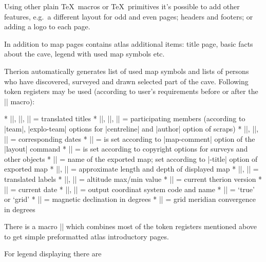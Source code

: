 Using other plain \TeX\ macros or \TeX\ primitives it's possible to add other 
features, e.g.~a different layout for odd and even pages; headers and footers;
or adding a logo to each page. 

In addition to map pages contains atlas additional items: title page, basic 
facts about the cave, legend with used map symbols etc.

Therion automatically generates list of used map symbols and lists of persons
who have discovered, surveyed and drawn selected part of the cave. 
Following token registers may be used (according to user's requirements 
before or after the |\insertmaps| macro):

\list
* |\explotitle|, |\topotitle|, |\cartotitle| = translated titles
* |\exploteam|, |\topoteam|, |\cartoteam| = participating members 
  (according to |team|, |explo-team| options for |centreline| and |author|
  option of scraps)
* |\explodate|, |\topodate|, |\cartodate| = corresponding dates 
* |\comment| = is set according to |map-comment| option of the |layout|
  command
* |\copyrights| = is set according to copyright options for surveys and other
  objects
* |\cavename| = name of the exported map; set according to |-title| option
  of exported map
* |\cavelength|, |\cavedepth| = approximate length and depth of displayed map
* |\cavelengthtitle|, |\cavedepthtitle| = translated labels
* |\cavemaxz|, |\caveminz| = altitude max/min value
* |\thversion| = current therion version
* |\currentdate| = current date
* |\outcscode|, |\outcsname| = output coordinat system code and name
* |\northdir| = `true' or `grid'
* |\magdecl| = magnetic declination in degrees
* |\gridconv| = grid meridian convergence in degrees
\endlist

There is a macro |\atlastitlepages| which combines most of the token registers 
mentioned above to get simple preformatted atlas introductory pages.

For legend displaying there are

